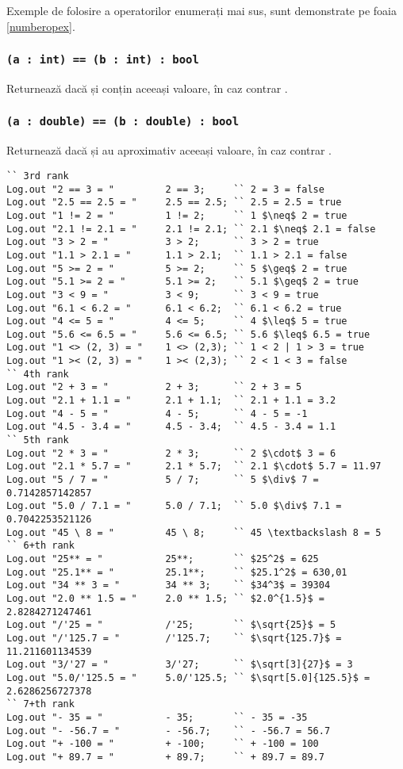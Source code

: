 Exemple de folosire a operatorilor enumerați mai sus, sunt demonstrate pe foaia \ref{numberopex}.

\subsubsection{\lstinline|(a : int) == (b : int) : bool|}

Returnează \true{} dacă  și  conțin aceeași valoare, în caz contrar \false{}.

\subsubsection{\lstinline|(a : double) == (b : double) : bool|}

Returnează \true{} dacă  și  au aproximativ aceeași valoare, în caz contrar \false{}.

\begin{lstlisting}[caption=Exemple de folosire al operatorilor asupra tipului int și double, label=numberopex]
`` 3rd rank
Log.out "2 == 3 = "			2 == 3;		`` 2 = 3 = false
Log.out "2.5 == 2.5 = "		2.5 == 2.5;	`` 2.5 = 2.5 = true
Log.out "1 != 2 = "			1 != 2;		`` 1 $\neq$ 2 = true
Log.out "2.1 != 2.1 = "		2.1 != 2.1;	`` 2.1 $\neq$ 2.1 = false
Log.out "3 > 2 = "			3 > 2;		`` 3 > 2 = true
Log.out "1.1 > 2.1 = "		1.1 > 2.1;	`` 1.1 > 2.1 = false
Log.out "5 >= 2 = "			5 >= 2;		`` 5 $\geq$ 2 = true
Log.out "5.1 >= 2 = "		5.1 >= 2;	`` 5.1 $\geq$ 2 = true
Log.out "3 < 9 = "			3 < 9;		`` 3 < 9 = true
Log.out "6.1 < 6.2 = "		6.1 < 6.2;	`` 6.1 < 6.2 = true
Log.out "4 <= 5 = "			4 <= 5;		`` 4 $\leq$ 5 = true
Log.out "5.6 <= 6.5 = "		5.6 <= 6.5;	`` 5.6 $\leq$ 6.5 = true
Log.out "1 <> (2, 3) = "	1 <> (2,3); `` 1 < 2 | 1 > 3 = true
Log.out "1 >< (2, 3) = "	1 >< (2,3); `` 2 < 1 < 3 = false
`` 4th rank
Log.out "2 + 3 = "			2 + 3;		`` 2 + 3 = 5
Log.out "2.1 + 1.1 = "		2.1 + 1.1;	`` 2.1 + 1.1 = 3.2
Log.out "4 - 5 = "			4 - 5;		`` 4 - 5 = -1
Log.out "4.5 - 3.4 = "		4.5 - 3.4;	`` 4.5 - 3.4 = 1.1
`` 5th rank
Log.out "2 * 3 = "			2 * 3;		`` 2 $\cdot$ 3 = 6
Log.out "2.1 * 5.7 = "		2.1 * 5.7;	`` 2.1 $\cdot$ 5.7 = 11.97
Log.out "5 / 7 = "			5 / 7;		`` 5 $\div$ 7 = 0.7142857142857
Log.out "5.0 / 7.1 = "		5.0 / 7.1;	`` 5.0 $\div$ 7.1 = 0.7042253521126
Log.out "45 \ 8 = "			45 \ 8;		`` 45 \textbackslash 8 = 5
`` 6+th rank
Log.out "25** = "			25**;		`` $25^2$ = 625
Log.out "25.1** = "			25.1**;		`` $25.1^2$ = 630,01
Log.out "34 ** 3 = "		34 ** 3;	`` $34^3$ = 39304
Log.out "2.0 ** 1.5 = "		2.0 ** 1.5;	`` $2.0^{1.5}$ = 2.8284271247461
Log.out "/'25 = "			/'25;		`` $\sqrt{25}$ = 5
Log.out "/'125.7 = "		/'125.7;	`` $\sqrt{125.7}$ = 11.211601134539
Log.out "3/'27 = "			3/'27;		`` $\sqrt[3]{27}$ = 3
Log.out "5.0/'125.5 = "		5.0/'125.5;	`` $\sqrt[5.0]{125.5}$ = 2.6286256727378
`` 7+th rank
Log.out "- 35 = "			- 35;		`` - 35 = -35
Log.out "- -56.7 = "		- -56.7;	`` - -56.7 = 56.7
Log.out "+ -100 = "			+ -100;		`` + -100 = 100
Log.out "+ 89.7 = "			+ 89.7;		`` + 89.7 = 89.7
\end{lstlisting}

